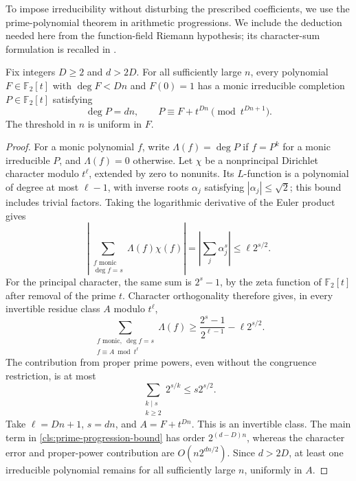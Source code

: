 To impose irreducibility without disturbing the prescribed coefficients,
we use the prime-polynomial theorem in arithmetic progressions.  We
include the deduction needed here from the function-field Riemann
hypothesis; its character-sum formulation is recalled in
\cite[Theorem~3.2 and Lemma~3.3]{GorodetskyKovaleva2024}.

\begin{lemma}
\label{cls:prescribed-prime}
Fix integers $D\geq2$ and $d>2D$.  For all sufficiently large $n$,
every polynomial $F\in\mathbb F_2[t]$ with $\deg F<Dn$ and $F(0)=1$
has a monic irreducible completion $P\in\mathbb F_2[t]$ satisfying
\[
  \deg P=dn,
  \qquad P\equiv F+t^{Dn}\pmod{t^{Dn+1}}.
\]
The threshold in $n$ is uniform in $F$.
\end{lemma}

\begin{proof}
For a monic polynomial $f$, write $\Lambda(f)=\deg P$ if $f=P^k$
for a monic irreducible $P$, and $\Lambda(f)=0$ otherwise.
Let $\chi$ be a nonprincipal Dirichlet character modulo $t^\ell$,
extended by zero to nonunits.  Its $L$-function is a polynomial of
degree at most $\ell-1$, with inverse roots $\alpha_j$ satisfying
$|\alpha_j|\leq\sqrt2$; this bound includes trivial factors.
Taking the logarithmic derivative of the Euler product gives
\[
  \left|\sum_{\substack{f\text{ monic}\\\deg f=s}}
       \Lambda(f)\chi(f)\right|
  =\left|\sum_j\alpha_j^s\right|
  \leq\ell2^{s/2}.
\]
For the principal character, the same sum is $2^s-1$, by the zeta
function of $\mathbb F_2[t]$ after removal of the prime $t$.
Character orthogonality therefore gives, in every invertible residue
class $A$ modulo $t^\ell$,
\begin{equation}
  \sum_{\substack{f\text{ monic},\ \deg f=s\\f\equiv A\bmod t^\ell}}
       \Lambda(f)
  \geq \frac{2^s-1}{2^{\ell-1}}-\ell2^{s/2}.
  \label{cls:prime-progression-bound}
\end{equation}
The contribution from proper prime powers, even without the congruence
restriction, is at most
\[
  \sum_{\substack{k\mid s\\k\geq2}}2^{s/k}
       \leq s2^{s/2}.
\]
Take $\ell=Dn+1$, $s=dn$, and $A=F+t^{Dn}$.  This is an invertible
class.  The main term in \eqref{cls:prime-progression-bound} has order
$2^{(d-D)n}$, whereas the character error and proper-power contribution
are $O(n2^{dn/2})$.  Since $d>2D$, at least one irreducible polynomial
remains for all sufficiently large $n$, uniformly in $A$.
\end{proof}

